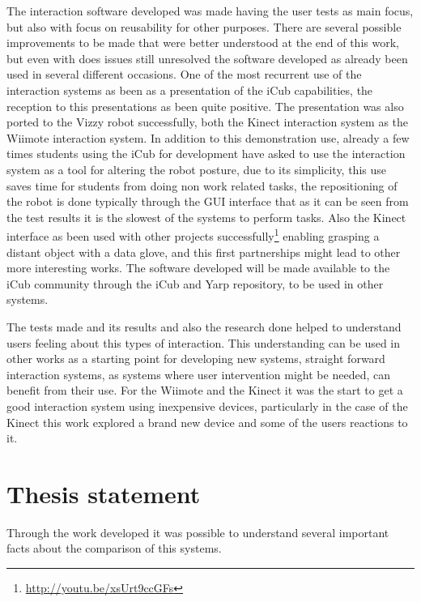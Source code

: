 	The interaction software developed was made having the user tests as main focus, but also with focus on reusability for other purposes. There are several possible improvements to be made that were better understood at the end of this work, but even with does issues still unresolved the software developed as already been used in several different occasions. One of the most recurrent use of the interaction systems as been as a presentation of the iCub capabilities, the reception to this presentations as been quite positive. The presentation was also ported to the Vizzy robot successfully, both the Kinect interaction system as the \ac{Wiimote} interaction system. In addition to this demonstration use, already a few times students using the iCub for development have asked to use the interaction system as a tool for altering the robot posture, due to its simplicity, this use saves time for students from doing non work related tasks, the repositioning of the robot is done typically through the \ac{GUI} interface that as it can be seen from the test results it is the slowest of the systems to perform tasks. Also the Kinect interface as been used with other projects successfully\footnote{\url{http://youtu.be/xsUrt9ccGFs}} enabling grasping a distant object with a data glove, and this first partnerships might lead to other more interesting works. The software developed will be made available to the iCub community through the iCub and \ac{Yarp} repository, to be used in other systems.
	
	The tests made and its results and also the research done helped to understand users feeling about this types of interaction. This understanding can be used in other works as a starting point for developing new systems, straight forward interaction systems, as systems where user intervention might be needed, can benefit from their use. For the \ac{Wiimote} and the Kinect it was the start to get a good interaction system using inexpensive devices, particularly in the case of the Kinect this work explored a brand new device and some of the users reactions to it.

\section{Thesis statement}

	Through the work developed it was possible to understand several important facts about the comparison of this systems.
	
